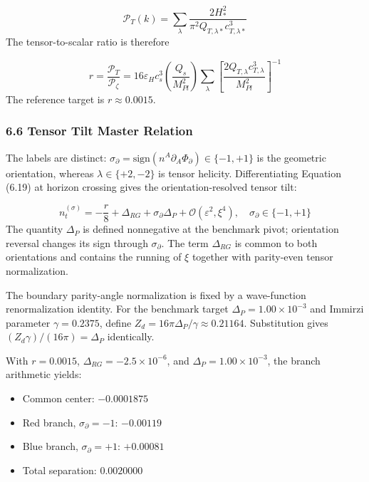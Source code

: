 \documentclass[aps,prd,onecolumn,superscriptaddress,nofootinbib,longbibliography,10pt]{revtex4-2}
\begin{document}
  \[ \mathcal{P}_T(k) = \sum_\lambda \frac{2H_*^2}{\pi^2 Q_{T,\lambda*} c_{T,\lambda*}^3} \]
  The tensor-to-scalar ratio is therefore


  \[ r = \frac{\mathcal{P}_T}{\mathcal{P}_\zeta} = 16\varepsilon_H c_s^3 \left(\frac{Q_s}{M_{Pl}^2}\right) \sum_\lambda \left[ \frac{2Q_{T,\lambda} c_{T,\lambda}^3}{M_{Pl}^2} \right]^{-1} \]
  The reference target is \(r \approx 0.0015\).



  
\subsubsection*{6.6 Tensor Tilt Master Relation}

  The labels are distinct: \(\sigma_\partial = \text{sign}(n^A\partial_A\Phi_\partial) \in \{-1, +1\}\) is the geometric orientation, whereas \(\lambda \in \{+2, -2\}\) is tensor helicity. Differentiating Equation (6.19) at horizon crossing gives the orientation-resolved tensor tilt:


  \[ n_t^{(\sigma)} = -\frac{r}{8} + \Delta_{RG} + \sigma_\partial \Delta_P + \mathcal{O}(\varepsilon^2, \xi^4), \quad \sigma_\partial \in \{-1, +1\} \]
  The quantity \(\Delta_P\) is defined nonnegative at the benchmark pivot; orientation reversal changes its sign through \(\sigma_\partial\). The term \(\Delta_{RG}\) is common to both orientations and contains the running of \(\xi\) together with parity-even tensor normalization.


  The boundary parity-angle normalization is fixed by a wave-function renormalization identity. For the benchmark target \(\Delta_P = 1.00 \times 10^{-3}\) and Immirzi parameter \(\gamma = 0.2375\), define \(Z_d = 16\pi\Delta_P/\gamma \approx 0.21164\). Substitution gives \((Z_d\gamma)/(16\pi) = \Delta_P\) identically.


  With \(r = 0.0015\), \(\Delta_{RG} = -2.5 \times 10^{-6}\), and \(\Delta_P = 1.00 \times 10^{-3}\), the branch arithmetic yields:


  
\begin{itemize}
    
\item Common center: \(-0.0001875\)
    
\item Red branch, \(\sigma_\partial = -1\): \(-0.00119\)
    
\item Blue branch, \(\sigma_\partial = +1\): \(+0.00081\)
    
\item Total separation: \(0.0020000\)
  
\end{itemize}
\end{document}
